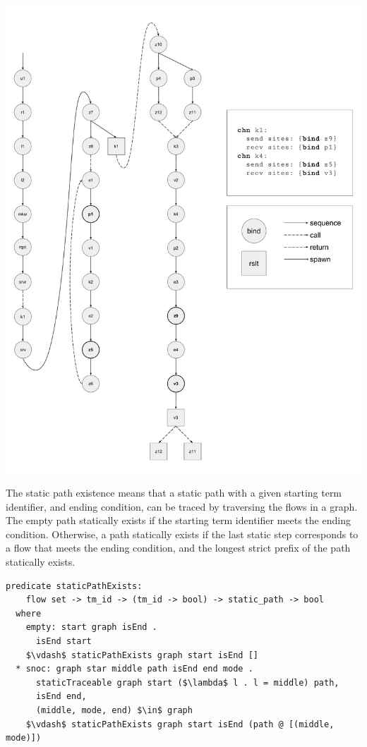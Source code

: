 \documentclass[letterpaper, 11pt]{extarticle}
\begin{document}
\includegraphics[width=.9\textwidth]{cml-graph.pdf}

The static path existence means that a static path with a given starting term identifier, and ending
condition, can be traced by traversing the flows in a graph.
The empty path statically exists if the starting term identifier meets the ending condition.
Otherwise, a path statically exists if the last static step corresponds to a flow
that meets the ending condition, and the longest strict prefix of the path statically
exists. 

\begin{lstlisting}[language=logic, mathescape]
  predicate staticPathExists:
    flow set -> tm_id -> (tm_id -> bool) -> static_path -> bool
  where
    empty: start graph isEnd .
      isEnd start
    $\vdash$ staticPathExists graph start isEnd []
  * snoc: graph star middle path isEnd end mode .
      staticTraceable graph start ($\lambda$ l . l = middle) path, 
      isEnd end, 
      (middle, mode, end) $\in$ graph 
    $\vdash$ staticPathExists graph start isEnd (path @ [(middle, mode)])
\end{lstlisting}
\end{document}
